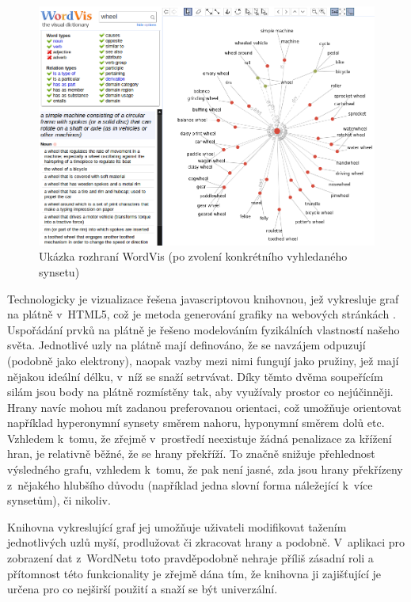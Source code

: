 \documentclass[a4paper, 11pt, oneside, showtrims]{book}
\begin{document}
					\begin{figure}[h]
						\centering
						\includegraphics[width=1.0\textwidth]{wordvis.png}
						\caption{Ukázka rozhraní WordVis (po zvolení konkrétního vyhledaného synsetu)}
						\label{fig:wordvis}
					\end{figure}

					Technologicky je vizualizace řešena javascriptovou knihovnou, jež vykresluje graf na plátně v~HTML5, což je metoda generování grafiky na webových stránkách \parencite{w3schools2017htmlcanvas}. Uspořádání prvků na plátně je řešeno modelováním fyzikálních vlastností našeho světa. Jednotlivé uzly na plátně mají definováno, že se navzájem odpuzují (podobně jako elektrony), naopak vazby mezi nimi fungují jako pružiny, jež mají nějakou ideální délku, v~níž se snaží setrvávat. Díky těmto dvěma soupeřícím silám jsou body na plátně rozmístěny tak, aby využívaly prostor co nejúčinněji. Hrany navíc mohou mít zadanou preferovanou orientaci, což umožňuje orientovat například hyperonymní synsety směrem nahoru, hyponymní směrem dolů etc. \parencite{wordvis2010vercruysse} Vzhledem k~tomu, že zřejmě v~prostředí neexistuje žádná penalizace za křížení hran, je relativně běžné, že se hrany překříží. To značně snižuje přehlednost výsledného grafu, vzhledem k~tomu, že pak není jasné, zda jsou hrany překřízeny z~nějakého hlubšího důvodu (například jedna slovní forma náležející k~více synsetům), či nikoliv. 

					Knihovna vykreslující graf jej umožňuje uživateli modifikovat tažením jednotlivých uzlů myší, prodlužovat či zkracovat hrany a podobně. V~aplikaci pro zobrazení dat z~WordNetu toto pravděpodobně nehraje příliš zásadní roli a přítomnost této funkcionality je zřejmě dána tím, že knihovna ji zajišťující je určena pro co nejširší použití a snaží se být univerzální. \parencite{wordvis2010vercruysse}
\end{document}
